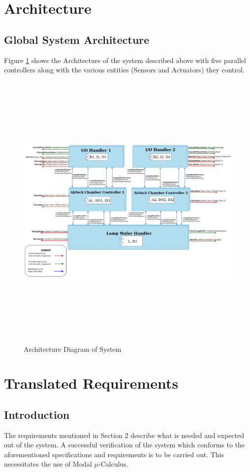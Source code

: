 \documentclass[a4paper,12pt]{article}
\begin{document}
	\section{Architecture}
	\subsection{Global System Architecture}
	Figure \ref{fig:arch1} shows the Architecture of the system described above with five parallel controllers along with the various entities (Sensors and Actuators) they control.\\
	
	\begin{figure}[ht]
		\centerline{
			\includegraphics[width=21cm, height=14cm]{Architecture(last-rot).jpg}}
		\caption{Architecture Diagram of System}
		\label{fig:arch1}
	\end{figure}
	\newpage
	\section{Translated Requirements}
	\subsection{Introduction}
	The requirements mentioned in Section 2 describe what is needed and expected out of the system. A successful verification of the system which conforms to the aforementioned specifications and requirements is to be carried out. This necessitates the use of Modal $\mu$-Calculus.   
\end{document}
